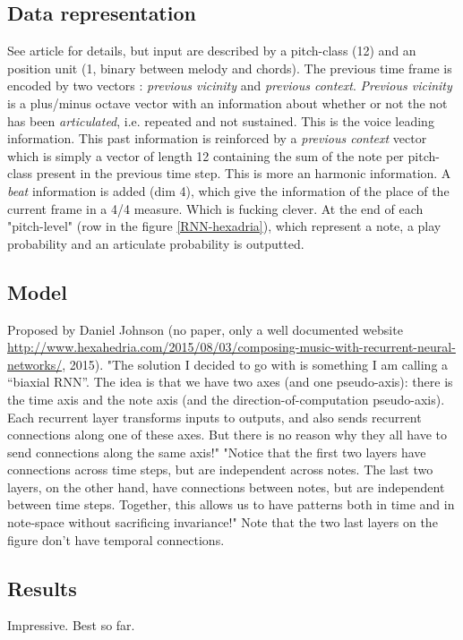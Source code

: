 \documentclass{report}
\begin{document}
\subsection{Data representation}
See article for details, but input are described by a pitch-class (12) and an position unit (1, binary between melody and chords). The previous time frame is encoded by two vectors : \textit{previous vicinity} and \textit{previous context}. \textit{Previous vicinity} is a plus/minus octave vector with an information about whether or not the not has been \textit{articulated}, i.e. repeated and not sustained. This is the voice leading information. This past information is reinforced by a \textit{previous context} vector which is simply a vector of length 12 containing the sum of the note per pitch-class present in the previous time step. This is more an harmonic information.
A \textit{beat} information is added (dim 4), which give the information of the place of the current frame in a 4/4 measure. Which is fucking clever.
At the end of each "pitch-level" (row in the figure \ref{RNN-hexadria}), which represent a note, a play probability and an articulate probability is outputted.

\subsection{Model}
Proposed by Daniel Johnson (no paper, only a well documented website \href{hexadria}{http://www.hexahedria.com/2015/08/03/composing-music-with-recurrent-neural-networks/}, 2015). 
"The solution I decided to go with is something I am calling a “biaxial RNN”. The idea is that we have two axes (and one pseudo-axis): there is the time axis and the note axis (and the direction-of-computation pseudo-axis). Each recurrent layer transforms inputs to outputs, and also sends recurrent connections along one of these axes. But there is no reason why they all have to send connections along the same axis!"
"Notice that the first two layers have connections across time steps, but are independent across notes. The last two layers, on the other hand, have connections between notes, but are independent between time steps. Together, this allows us to have patterns both in time and in note-space without sacrificing invariance!"
Note that the two last layers on the figure don't have temporal connections.

\subsection{Results}
Impressive. Best so far.



\end{document}
